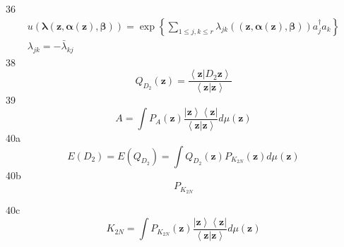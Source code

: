 \documentclass[aps,preprint]{revtex4}%
\begin{document}
36%
\begin{gather*}
u\left(  \mathbf{\lambda}\left(  \mathbf{z,\alpha\left(  \mathbf{z}\right)
,\beta}\right)  \right)  =\exp\left\{  \sum\limits_{1\leq j,k\leq r}%
\lambda_{jk}\left(  \left(  \mathbf{z,\alpha\left(  \mathbf{z}\right)  ,\beta
}\right)  \right)  a_{j}^{\dagger}a_{k}\right\} \\
\lambda_{jk}=-\bar{\lambda}_{kj}\,
\end{gather*}
38%
\[
Q_{D_{2}}\left(  \mathbf{z}\right)  =\frac{\left\langle \mathbf{z}\left\vert
D_{2}\mathbf{z}\right.  \right\rangle }{\left\langle \mathbf{z}\left\vert
\mathbf{z}\right.  \right\rangle }%
\]
39%
\[
A=\int P_{A}\left(  \mathbf{z}\right)  \frac{\left\vert \mathbf{z}%
\right\rangle \left\langle \mathbf{z}\right\vert }{\left\langle \mathbf{z}%
\left\vert \mathbf{z}\right.  \right\rangle }d\mu\left(  \mathbf{z}\right)
\]
40a%
\[
E\left(  D_{2}\right)  =E\left(  Q_{D_{2}}\right)  =\int Q_{D_{2}}\left(
\mathbf{z}\right)  P_{K_{2N}}\left(  \mathbf{z}\right)  d\mu\left(
\mathbf{z}\right)
\]
40b
\[
P_{K_{2N}}%
\]


40c
\[
K_{2N}=\int P_{K_{2N}}\left(  \mathbf{z}\right)  \frac{\left\vert
\mathbf{z}\right\rangle \left\langle \mathbf{z}\right\vert }{\left\langle
\mathbf{z}\left\vert \mathbf{z}\right.  \right\rangle }d\mu\left(
\mathbf{z}\right)
\]
\end{document}
